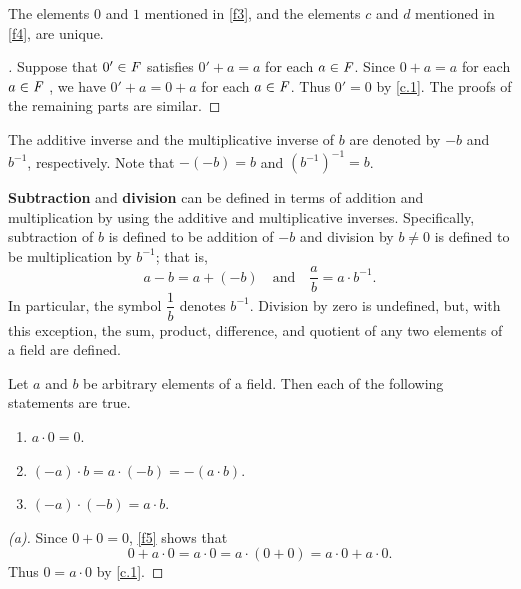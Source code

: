 \begin{cor}\label{c.0.5}
  The elements \(0\) and \(1\) mentioned in \ref{f3}, and the elements \(c\) and \(d\) mentioned in \ref{f4}, are unique.
\end{cor}

\begin{proof}[]
  Suppose that \(0' \in \mathit{F}\) satisfies \(0' + a = a\) for each \(a \in \mathit{F}\).
  Since \(0 + a = a\) for each \(a \in \mathit{F}\) , we have \(0' + a = 0 + a\) for each \(a \in \mathit{F}\).
  Thus \(0' = 0\) by \cref{c.1}.
  The proofs of the remaining parts are similar.
\end{proof}

\begin{defn}\label{c.0.6}
  The additive inverse and the multiplicative inverse of \(b\) are denoted by \(-b\) and \(b^{-1}\), respectively.
  Note that \(-(-b) = b\) and \((b^{-1})^{-1} = b\).
\end{defn}

\begin{defn}\label{c.0.7}
  \textbf{Subtraction} and \textbf{division} can be defined in terms of addition and multiplication by using the additive and multiplicative inverses.
  Specifically, subtraction of \(b\) is defined to be addition of \(-b\) and division by \(b \neq 0\) is defined to be multiplication by \(b^{-1}\);
  that is,
  \[
    a - b = a + (-b) \quad \text{and} \quad \dfrac{a}{b} = a \cdot b^{-1}.
  \]
  In particular, the symbol \(\dfrac{1}{b}\) denotes \(b^{-1}\).
  Division by zero is undefined, but, with this exception, the sum, product, difference, and quotient of any two elements of a field are defined.
\end{defn}

\begin{thm}\label{c.2}
  Let \(a\) and \(b\) be arbitrary elements of a field.
  Then each of the following statements are true.
  \begin{enumerate}
    \item \(a \cdot 0 = 0\).
    \item \((-a) \cdot b = a \cdot (-b) = -(a \cdot b)\).
    \item \((-a) \cdot (-b) = a \cdot b\).
  \end{enumerate}
\end{thm}

\begin{proof}[(a)]
  Since \(0 + 0 = 0\), \ref{f5} shows that
  \[
    0 + a \cdot 0 = a \cdot 0 = a \cdot (0 + 0) = a \cdot 0 + a \cdot 0.
  \]
  Thus \(0 = a \cdot 0\) by \cref{c.1}.
\end{proof}

